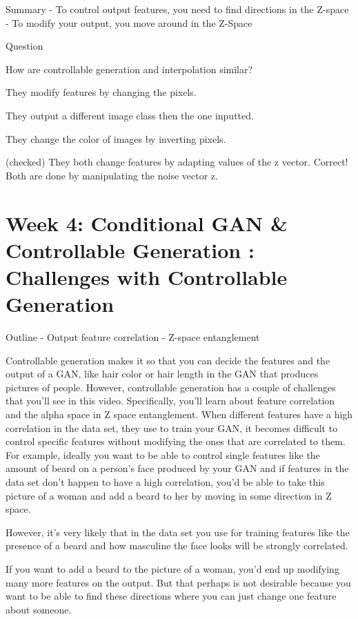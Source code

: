 \documentclass[11pt, onecolumn]{article}
\begin{document}
Summary
- To control output features, you need to find directions in the Z-space
- To modify your output, you move around in the Z-Space

Question

How are controllable generation and interpolation similar?

They modify features by changing the pixels.

They output a different image class then the one inputted.

They change the color of images by inverting pixels.

(checked) They both change features by adapting values of the z vector.
Correct! Both are done by manipulating the noise vector z.

\section{Week 4: Conditional GAN \& Controllable Generation : Challenges with Controllable Generation}

Outline
- Output feature correlation
- Z-space entanglement

Controllable generation makes it so that you can
decide the features and the output of a GAN,
like hair color or hair length in
the GAN that produces pictures of people.
However, controllable generation has
a couple of challenges that you'll see in this video.
Specifically, you'll learn about feature correlation
and the alpha space in Z space entanglement.
When different features have a high
correlation in the data set,
they use to train your GAN,
it becomes difficult to control specific features without
modifying the ones that are correlated to them.
For example, ideally you want to be able to
control single features like the amount of
beard on a person's face produced by your GAN and if
features in the data set don't
happen to have a high correlation,
you'd be able to take this picture
of a woman and add a beard
to her by moving in some direction in Z space.

However, it's very likely that in the data set you use for training features like the presence of a beard and how masculine the face looks will be strongly correlated.

If you want to add a beard to the picture of a woman, you'd end up modifying many more features on the output. But that perhaps is not desirable because you want to be able to find these directions where you can just change one feature about someone.
\end{document}
